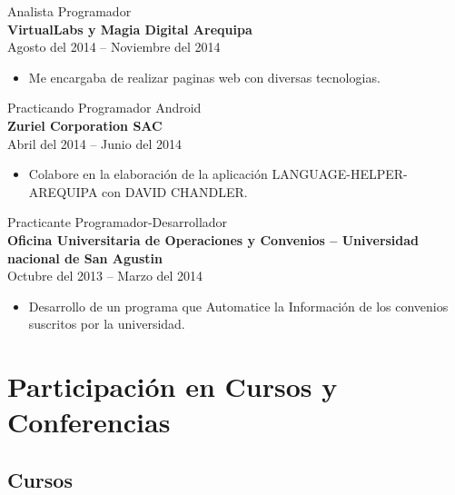 \documentclass[letterpaper]{twentysecondcv} %
\begin{document}
{\Large Analista Programador}\\
{\large \bf VirtualLabs y Magia Digital Arequipa}\\
{Agosto del 2014 -- Noviembre del 2014}
\begin{itemize}
\item Me encargaba de realizar paginas web con diversas tecnologias. \\
\end{itemize}


{\Large Practicando Programador Android}\\
{\large \bf Zuriel Corporation SAC}\\
{Abril del 2014 -- Junio del 2014}
\begin{itemize}
\item Colabore en la elaboración de la aplicación LANGUAGE-HELPER-AREQUIPA con DAVID CHANDLER.\\
\end{itemize}


{\Large Practicante Programador-Desarrollador}\\
{\large \bf Oficina Universitaria de Operaciones y Convenios – Universidad nacional de San Agustin}\\
{Octubre del 2013 -- Marzo del 2014}
\begin{itemize}
\item Desarrollo de un programa que Automatice la Información de los convenios suscritos por la universidad.\\  
\end{itemize}


\section{Participación en Cursos y Conferencias}

\subsection{Cursos}
\end{document}

